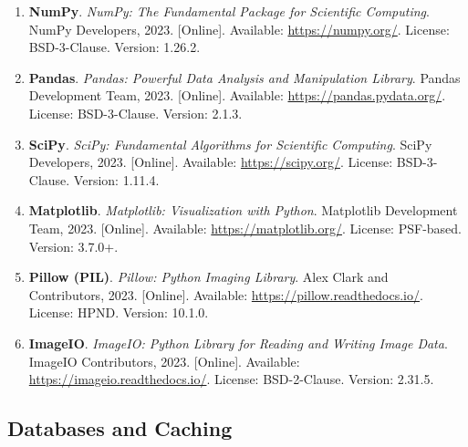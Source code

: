 \begin{enumerate}[resume]
    \item \textbf{NumPy}. \textit{NumPy: The Fundamental Package for Scientific Computing}. 
    NumPy Developers, 2023. [Online]. Available: \url{https://numpy.org/}. 
    License: BSD-3-Clause. Version: 1.26.2.
    
    \item \textbf{Pandas}. \textit{Pandas: Powerful Data Analysis and Manipulation Library}. 
    Pandas Development Team, 2023. [Online]. Available: \url{https://pandas.pydata.org/}. 
    License: BSD-3-Clause. Version: 2.1.3.
    
    \item \textbf{SciPy}. \textit{SciPy: Fundamental Algorithms for Scientific Computing}. 
    SciPy Developers, 2023. [Online]. Available: \url{https://scipy.org/}. 
    License: BSD-3-Clause. Version: 1.11.4.
    
    \item \textbf{Matplotlib}. \textit{Matplotlib: Visualization with Python}. 
    Matplotlib Development Team, 2023. [Online]. Available: \url{https://matplotlib.org/}. 
    License: PSF-based. Version: 3.7.0+.
    
    \item \textbf{Pillow (PIL)}. \textit{Pillow: Python Imaging Library}. 
    Alex Clark and Contributors, 2023. [Online]. Available: \url{https://pillow.readthedocs.io/}. 
    License: HPND. Version: 10.1.0.
    
    \item \textbf{ImageIO}. \textit{ImageIO: Python Library for Reading and Writing Image Data}. 
    ImageIO Contributors, 2023. [Online]. Available: \url{https://imageio.readthedocs.io/}. 
    License: BSD-2-Clause. Version: 2.31.5.
\end{enumerate}

\subsection*{Databases and Caching}

